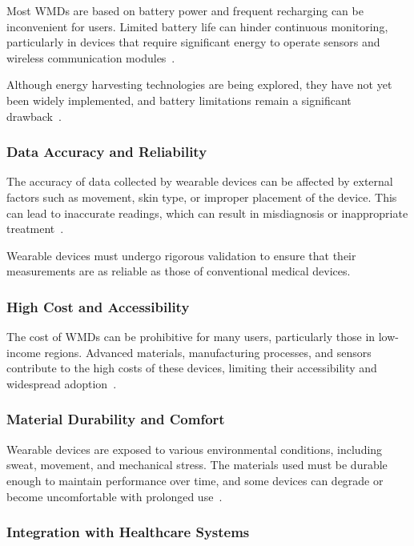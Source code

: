 \documentclass[journal]{IEEEtran}
\begin{document}
        Most WMDs are based on battery power and frequent recharging can be inconvenient for users. Limited battery life can hinder continuous monitoring, particularly in devices that require significant energy to operate sensors and wireless communication modules~\cite{Ates2022}.

        Although energy harvesting technologies are being explored, they have not yet been widely implemented, and battery limitations remain a significant drawback~\cite{Gao2024}.

        \subsubsection{Data Accuracy and Reliability}

        The accuracy of data collected by wearable devices can be affected by external factors such as movement, skin type, or improper placement of the device. This can lead to inaccurate readings, which can result in misdiagnosis or inappropriate treatment~\cite{Lu2020}.

        Wearable devices must undergo rigorous validation to ensure that their measurements are as reliable as those of conventional medical devices.

        \subsubsection{High Cost and Accessibility}

        The cost of WMDs can be prohibitive for many users, particularly those in low-income regions. Advanced materials, manufacturing processes, and sensors contribute to the high costs of these devices, limiting their accessibility and widespread adoption~\cite{Liu2018}.

        \subsubsection{Material Durability and Comfort}

        Wearable devices are exposed to various environmental conditions, including sweat, movement, and mechanical stress. The materials used must be durable enough to maintain performance over time, and some devices can degrade or become uncomfortable with prolonged use~\cite{Luo2024}.

        \subsubsection{Integration with Healthcare Systems}
\end{document}
